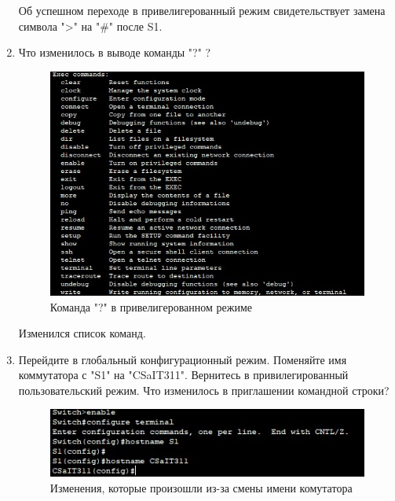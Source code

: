\documentclass[bachelor, och, labwork]{shiza}
\begin{document}
\begin{enumerate}
    Об успешном переходе в привелигерованный режим свидетельствует замена символа ">" на "\#" после S1.

    \item Что изменилось в выводе команды "?" ?
    
    \begin{figure}[H]
        \centering      %
        \includegraphics[width=1\textwidth]{9}
        \caption{Команда "?" в привелигерованном режиме}
        \label{fig:image1}
    \end{figure}

    Изменился список команд.

    \item Перейдите в глобальный конфигурационный режим. Поменяйте имя коммутатора с "S1" на "CSaIT311". 
    Вернитесь в привилегированный пользовательский режим. Что изменилось в приглашении командной строки?

    \begin{figure}[H]
        \centering      %
        \includegraphics[width=1\textwidth]{10}
        \caption{Изменения, которые произошли из-за смены имени комутатора}
        \label{fig:image1}
    \end{figure}


\end{enumerate}
\end{document}
